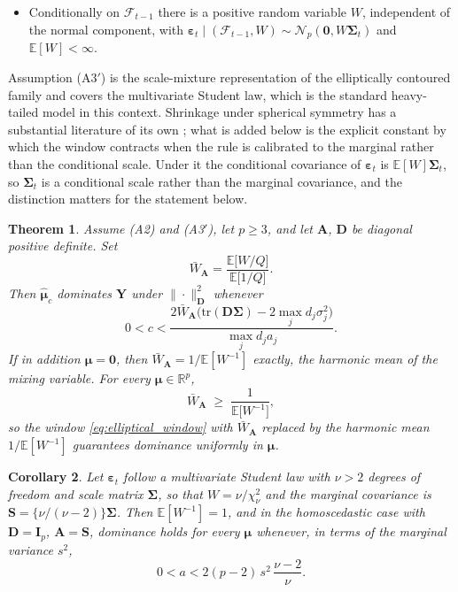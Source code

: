 \documentclass[pdflatex,sn-mathphys-num]{sn-jnl}%
\theoremstyle{thmstyleone}%
\newtheorem{theorem}{Theorem}%
\newtheorem{corollary}[theorem]{Corollary}%
\theoremstyle{thmstyletwo}%
\theoremstyle{thmstylethree}%
\newcommand{\rev}[1]{{\color{blue}#1}}
\newcommand{\tr}{\mathrm{tr}}
\newcommand{\E}{\mathbb{E}}
\newcommand{\Real}{\mathbb{R}}
\begin{document}
\begin{itemize}
\item[(A3$'$)] Conditionally on $\mathcal F_{t-1}$ there is a positive random variable $W$, independent of the normal component, with $\bm\varepsilon_t\mid(\mathcal F_{t-1},W)\sim\mathcal N_p(\bm 0,W\bm\Sigma_t)$ and $\E[W]<\infty$.
\end{itemize}

Assumption (A3$'$) is the scale-mixture representation of the elliptically contoured family \cite{fang1990} and covers the multivariate Student law, which is the standard heavy-tailed model in this context. Shrinkage under spherical symmetry has a substantial literature of its own \cite{strawderman1974, brandwein1990, cellier1995, cellier1995b, brandwein2012}; what is added below is the explicit constant by which the window contracts when the rule is calibrated to the marginal rather than the conditional scale. Under it the conditional covariance of $\bm\varepsilon_t$ is $\E[W]\bm\Sigma_t$, so $\bm\Sigma_t$ is a conditional scale rather than the marginal covariance, and the distinction matters for the statement below.

\begin{theorem}
\label{thm:elliptical}
Assume (A2) and (A3$'$), let $p\ge3$, and let $\bm A$, $\bm D$ be diagonal positive definite. Set
\begin{equation}
\bar W_{\bm A}=\frac{\E\bigl[W/Q\bigr]}{\E\bigl[1/Q\bigr]} .
\end{equation}
Then $\hat{\bm\mu}_c$ dominates $\bm Y$ under $\|\cdot\|^2_{\bm D}$ whenever
\begin{equation}
\label{eq:elliptical_window}
0<c<\frac{2\bar W_{\bm A}\bigl(\tr(\bm D\bm\Sigma)-2\max_j d_j\sigma^2_j\bigr)}{\max_j d_j a_j} .
\end{equation}
If in addition $\bm\mu=\bm 0$, then $\bar W_{\bm A}=1/\E[W^{-1}]$ exactly, the harmonic mean of the mixing variable. \rev{For every $\bm\mu\in\Real^p$,
\begin{equation}
\label{eq:harmonic_lower}
\bar W_{\bm A}\;\ge\;\frac{1}{\E\bigl[W^{-1}\bigr]},
\end{equation}
so the window \eqref{eq:elliptical_window} with $\bar W_{\bm A}$ replaced by the harmonic mean $1/\E[W^{-1}]$ guarantees dominance uniformly in $\bm\mu$.}
\end{theorem}

\begin{corollary}
\label{cor:student}
Let $\bm\varepsilon_t$ follow a multivariate Student law with $\nu>2$ degrees of freedom and scale matrix $\bm\Sigma$, so that $W=\nu/\chi^2_\nu$ and the marginal covariance is $\bm S=\{\nu/(\nu-2)\}\bm\Sigma$. Then $\E[W^{-1}]=1$, and in the homoscedastic case with $\bm D=\bm I_p$, $\bm A=\bm S$, \rev{dominance holds for every $\bm\mu$ whenever,} in terms of the marginal variance $s^2$,
\begin{equation}
\label{eq:student_window}
0<a<2(p-2)\,s^{2}\,\frac{\nu-2}{\nu} .
\end{equation}
\end{corollary}
\end{document}
